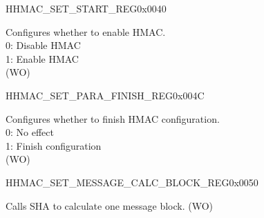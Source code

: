 \begin{register}{H}{HMAC\_SET\_START\_REG}{0x0040}\label{regdesc:HMACSETSTARTREG}
%
%
\regnewline%
\begin{regdesc}\begin{reglist}
\label{fielddesc:HMACSETSTART}\item [HMAC\_SET\_START] Configures whether to enable HMAC.
\\0: Disable HMAC
\\1: Enable HMAC
\\(WO)
\end{reglist}\end{regdesc}
\end{register}


\begin{register}{H}{HMAC\_SET\_PARA\_FINISH\_REG}{0x004C}\label{regdesc:HMACSETPARAFINISHREG}
%
%
\regnewline%
\begin{regdesc}\begin{reglist}
\label{fielddesc:HMACSETPARAEND}\item [HMAC\_SET\_PARA\_END] Configures whether to finish HMAC configuration.
\\0: No effect
\\1: Finish configuration
\\(WO)
\end{reglist}\end{regdesc}
\end{register}


\begin{register}{H}{HMAC\_SET\_MESSAGE\_CALC\_BLOCK\_REG}{0x0050}\label{regdesc:HMACSETMESSAGEONEREG}
%
%
\regnewline%
\begin{regdesc}\begin{reglist}
\label{fielddesc:HMACSETTEXTONE}\item [HMAC\_SET\_TEXT\_ONE] Calls SHA to calculate one message block. (WO)
\end{reglist}\end{regdesc}
\end{register}


